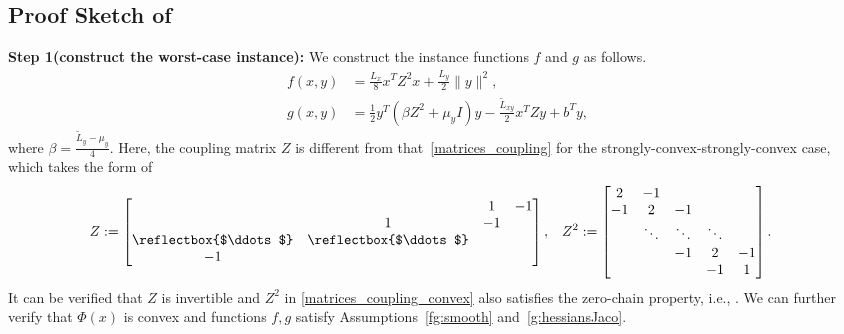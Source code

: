 \documentclass{osudissert96}
\begin{document}
\subsection*{Proof Sketch of }
{\bf Step 1(construct the worst-case instance):} We construct the instance functions $f$ and $g$ as follows.
\begin{align}\label{con_fg}
f(x,y) &= \frac{L_x}{8} x^T Z^2 x+ \frac{L_y}{2}\|y\|^2, \nonumber
\\g(x,y) &= \frac{1}{2} y^T (\beta Z^2 +\mu_y I)y -\frac{\widetilde L_{xy}}{2} x^TZy + b^Ty, 
\end{align}
where $\beta=\frac{\widetilde L_y-\mu_y}{4}$.  Here, the coupling matrix $Z$ is different from that~\cref{matrices_coupling} for the strongly-convex-strongly-convex case, which takes the form of 
\begin{align}\label{matrices_coupling_convex}
Z:=\begin{bmatrix}
   & &  1& -1\\
   &1&  -1&   \\
 \text{\reflectbox{$\ddots $}}  &\text{\reflectbox{$\ddots$}}  &  \\
  -1&   &  & \\ 
\end{bmatrix},\quad
&Z^2 := 
\begin{bmatrix}
 2& -1 &  &  & \\
 -1& 2  &-1 &  & \\
 &   \ddots & \ddots & \ddots  & \\
  && -1& 2 & -1 \\
  &  & & -1 & 1\\ 
\end{bmatrix}.
\end{align}
It can be verified that $Z$ is invertible and $Z^2$ in  \cref{matrices_coupling_convex} also satisfies the zero-chain property, i.e., . 
We can further verify that  $\Phi(x)$ is convex and functions $f,g$ satisfy Assumptions~\ref{fg:smooth} and~\ref{g:hessiansJaco}.  
\end{document}
